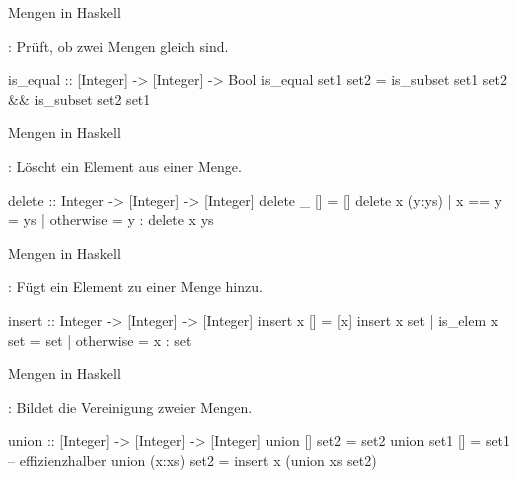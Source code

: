 \resetframecounters
\begin{frame}[fragile]{Mengen in Haskell}\onslide<+->%
    \begin{exercise}[d)]
        : Prüft, ob zwei Mengen gleich sind.
        \end{exercise}
        \onslide<+->\begin{solve}[d)]
        \begin{plainhaskell}
is_equal :: [Integer] -> [Integer] -> Bool
is_equal set1 set2 = is_subset set1 set2 && is_subset set2 set1
        \end{plainhaskell}
        \end{solve}
\end{frame}
\resetframecounters
\begin{frame}[fragile]{Mengen in Haskell}\onslide<+->%
    \begin{exercise}[e)]
        : Löscht ein Element aus einer Menge.
        \end{exercise}
        \onslide<+->\begin{solve}[e)]
        \begin{plainhaskell}
delete :: Integer -> [Integer] -> [Integer]
delete _ [] = []
delete x (y:ys)
    | x == y = ys
    | otherwise = y : delete x ys
        \end{plainhaskell}
        \end{solve}
\end{frame}
\resetframecounters
\begin{frame}[fragile]{Mengen in Haskell}\onslide<+->%
    \begin{exercise}[f)]
        : Fügt ein Element zu einer Menge hinzu.
        \end{exercise}
        \onslide<+->\begin{solve}[f)]
        \begin{plainhaskell}
insert :: Integer -> [Integer] -> [Integer]
insert x [] = [x]
insert x set
    | is_elem x set = set
    | otherwise = x : set
        \end{plainhaskell}
        \end{solve}
\end{frame}
\resetframecounters
\begin{frame}[fragile]{Mengen in Haskell}\onslide<+->%
    \begin{exercise}[g)]
        : Bildet die Vereinigung zweier Mengen.
        \end{exercise}
        \onslide<+->\begin{solve}[g)]
        \begin{plainhaskell}
union :: [Integer] -> [Integer] -> [Integer]
union [] set2 = set2
union set1 [] = set1 -- effizienzhalber
union (x:xs) set2 = insert x (union xs set2)
        \end{plainhaskell}
        \end{solve}
\end{frame}